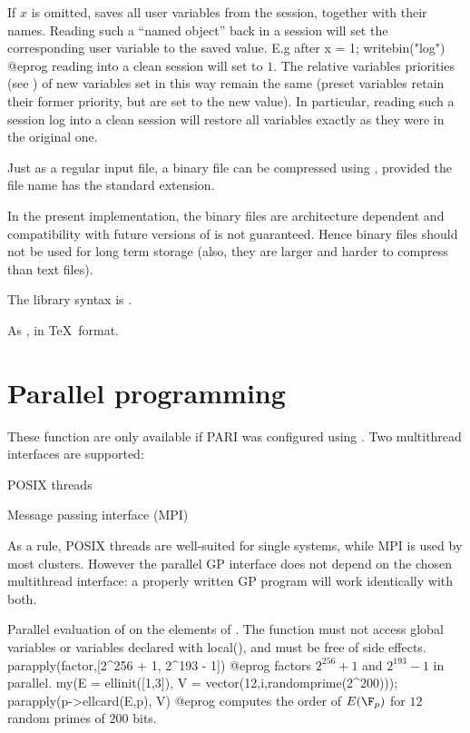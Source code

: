 If $x$ is omitted, saves all user variables from the session, together with
their names. Reading such a ``named object'' back in a  session will set
the corresponding user variable to the saved value. E.g after
\bprog
x = 1; writebin("log")
@eprog\noindent
reading  into a clean session will set  to $1$.
The relative variables priorities (see ) of new variables
set in this way remain the same (preset variables retain their former
priority, but are set to the new value). In particular, reading such a
session log into a clean session will restore all variables exactly as they
were in the original one.

Just as a regular input file, a binary file can be compressed
using , provided the file name has the standard 
extension.

In the present implementation, the binary files are architecture dependent
and compatibility with future versions of  is not guaranteed. Hence
binary files should not be used for long term storage (also, they are
larger and harder to compress than text files).

The library syntax is .

\label{se:writetex}
As , in \TeX\ format.

\section{Parallel programming}

These function are only available if PARI was configured using . Two multithread interfaces are supported:

\item POSIX threads

\item Message passing interface (MPI)

As a rule, POSIX threads are well-suited for single systems, while MPI is used
by most clusters. However the parallel GP interface does not depend on the
chosen multithread interface: a properly written GP program will work
identically with both.


\label{se:parapply}
Parallel evaluation of  on the elements of .
The function  must not access global variables or variables
declared with local(), and must be free of side effects.
\bprog
parapply(factor,[2^256 + 1, 2^193 - 1])
@eprog
factors $2^{256} + 1$ and $2^{193} - 1$ in parallel.
\bprog
{
  my(E = ellinit([1,3]), V = vector(12,i,randomprime(2^200)));
  parapply(p->ellcard(E,p), V)
}
@eprog
computes the order of $E(\F_p)$ for $12$ random primes of $200$ bits.


